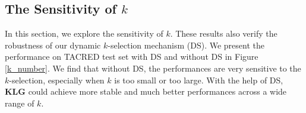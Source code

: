 \subsection{The Sensitivity of $k$}
In this section, we explore the sensitivity of $k$. These results also verify the robustness of our dynamic $k$-selection mechanism (DS). We present the performance on TACRED test set with DS and without DS in Figure \ref{k_number}. We find that without DS, the performances are very sensitive to the $k$-selection, especially when $k$ is too small or too large. With the help of DS, \textbf{KLG} could achieve more stable and much better performances across a wide range of $k$.


%
